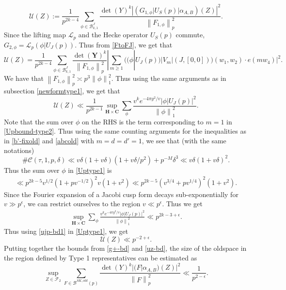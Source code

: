 \documentclass[11pt]{amsart}
\numberwithin{equation}{section}
\theoremstyle{plain}
\theoremstyle{definition}
\newcommand{\mf}{\mathbf}
\newcommand{\mc}{\mathcal}
\newcommand*{\norm}[1]{\left\lVert#1\right\rVert}
\begin{document}
\begin{equation}
    \mc U(Z):=\frac{1}{p^{2k-4}}\sum_{\phi\in \mc B_{k,1}^J}\frac{\det(Y)^k |(G_{1,\phi}|U_S(p)|\alpha_{A,B})(Z)|^2}{\norm{F_{1,\phi}}^2_p}.
\end{equation}
Since the lifting map $\mc L_p$ and the Hecke operator $U_S(p)$ commute, $G_{2,\phi}= \mc L_p(\phi|U_J(p))$. Thus from \eqref{FtoFJ}, we get that 
\begin{equation}
    \mc U(Z)= \frac{1}{p^{2k-4}}\sum_{\phi\in \mc B_{k,1}^J}\frac{\det(\mf Y)^k}{\norm{F_{1,\phi}}^2_p}|\sum_{m \ge 1} ((\phi|U_J(p))|V_m |(J, [0,0]))(w_1,w_2) \cdot e(m w_4)|^2.
\end{equation}
We have that $\norm{F_{1,\phi}}^2_p\asymp p^3 \norm{\phi}^2_1$. Thus using the same arguments as in subsection \ref{newformtype1}, we get that
\begin{equation} \label{Uptype1}
    \mc U(Z)\ll \frac{1}{p^{2k-1}}\sup_{\mf H\times \mf C}\sum_{\phi} \frac{v^k e^{-4\pi y^2/v}|\phi|U_J(p)|^2}{\norm {\phi}_1^2}.
\end{equation}
Note that the sum over $\phi$ on the RHS is the term corresponding to $m=1$ in \eqref{Upbound-type2}. Thus using the same counting arguments for the inequalities as in \eqref{b'-fixold} and \eqref{abcold} with $m=d=d'=1$, we see that (with the same notations)
\begin{equation}
     \# \mc C(\tau, 1,p, \delta) \ll v\delta(1+v\delta)(1+v\delta/p^2)+ p^{-M}\delta^3\ll v\delta(1+v\delta)^2.
\end{equation}
Thus the sum over $\phi$ in \eqref{Uptype1} is
\begin{align}\label{BJbound}
   \ll p^{2k-5}v^{1/2} (1+pv^{-1/2})^2 v(1+v^2)\ll p^{2k-5} (v^{3/4}+pv^{1/4})^2 (1+v^2).
\end{align}
Since the Fourier expansion of a Jacobi cusp form decays sub-exponentially for $v\gg p^\epsilon$, we can restrict ourselves to the region $v\ll p^\epsilon$. Thus we get
\begin{align} \label{ujp-bd1}
   \sup_{\mf H\times \mf C}\sum_{\phi} \frac{v^k e^{-4\pi y^2/v}|\phi|U_J(p)|^2}{\norm {\phi}_1^2} \ll p^{2k-3+\epsilon}.
\end{align}
Thus using \eqref{ujp-bd1} in \eqref{Uptype1}, we get
\begin{equation} \label{uz-bd}
   \mc U(Z)\ll p^{-2+\epsilon}.
\end{equation}
Putting together the bounds from \eqref{g+-bd} and \eqref{uz-bd}, the size of the oldspace in the region defined by Type 1 representatives can be estimated as 
\begin{equation}
    \sup_{Z\in\mc F_2}\sum_{F\in \mc B^{SK, old}(p)}\frac{\det(Y)^k|(F|\alpha_{A,B})(Z)|^2}{\norm{F}^2_p}\ll \frac{1}{p^{2-\epsilon}}.
\end{equation}
\end{document}
